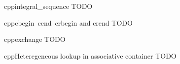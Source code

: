 \documentclass[10pt,a4paper]{article}
\begin{document}
\begin{multicols}{3}
\begin{codebox}{cpp}{integral\_sequence}
TODO

\end{codebox}

\begin{codebox}{cpp}{cbegin\, cend\, crbegin and crend}
TODO

\end{codebox}

\begin{codebox}{cpp}{exchange}
TODO

\end{codebox}

\begin{codebox}{cpp}{Heteregeneous lookup in associative container}
TODO

\end{codebox}


\AtNextBibliography{\footnotesize}
\printbibliography  
\end{multicols}
\end{document}
